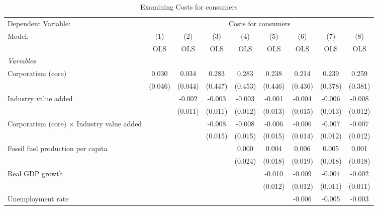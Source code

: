 
\begin{table}[htbp]
   \caption{Examining Costs for consumers}
   \centering
   \begin{tabular}{lcccccccc}
      \toprule
      Dependent Variable: & \multicolumn{8}{c}{Costs for consumers}\\
      Model:                                            & (1)     & (2)     & (3)     & (4)     & (5)     & (6)     & (7)     & (8)\\  
                                                        &  OLS    & OLS     & OLS     & OLS     & OLS     & OLS     & OLS     & OLS\\  
      \midrule
      \emph{Variables}\\
      Corporatism (core)                                & 0.030   & 0.034   & 0.283   & 0.283   & 0.238   & 0.214   & 0.239   & 0.259\\   
                                                        & (0.046) & (0.044) & (0.447) & (0.453) & (0.446) & (0.436) & (0.378) & (0.381)\\   
      Industry value added                              &         & -0.002  & -0.003  & -0.003  & -0.001  & -0.004  & -0.006  & -0.008\\   
                                                        &         & (0.011) & (0.011) & (0.012) & (0.013) & (0.015) & (0.013) & (0.012)\\   
      Corporatism (core) $\times$ Industry value added  &         &         & -0.008  & -0.008  & -0.006  & -0.006  & -0.007  & -0.007\\   
                                                        &         &         & (0.015) & (0.015) & (0.015) & (0.014) & (0.012) & (0.012)\\   
      Fossil fuel production per capita                 &         &         &         & 0.000   & 0.004   & 0.006   & 0.005   & 0.001\\   
                                                        &         &         &         & (0.024) & (0.018) & (0.019) & (0.018) & (0.018)\\   
      Real GDP growth                                   &         &         &         &         & -0.010  & -0.009  & -0.004  & -0.002\\   
                                                        &         &         &         &         & (0.012) & (0.012) & (0.011) & (0.011)\\   
      Unemployment rate                                 &         &         &         &         &         & -0.006  & -0.005  & -0.003\\   

\end{tabular}
\end{table}
